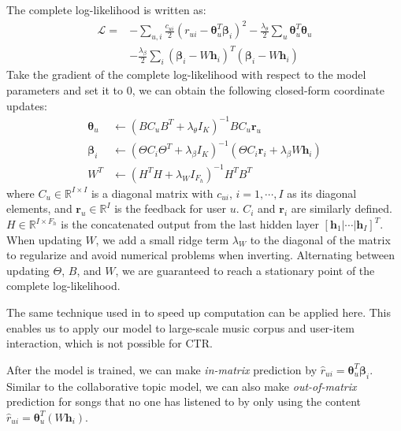 The complete log-likelihood is written as:
\begin{equation*}
\begin{split}
\mathcal{L} =& -\sum_{u, i} \frac{c_{ui}}{2} (r_{ui} - \boldsymbol\theta_u^T\boldsymbol\beta_i)^2 - \frac{\lambda_\theta}{2} \sum_u \boldsymbol\theta_u^T \boldsymbol\theta_u \\
&- \frac{\lambda_\beta}{2} \sum_i (\boldsymbol\beta_i - W\boldsymbol{h}_i)^T (\boldsymbol\beta_i - W\boldsymbol{h}_i)
\end{split}
\end{equation*}
Take the gradient of the complete log-likelihood with respect to the model parameters and set it to 0, we can obtain the following closed-form coordinate updates:
\begin{align}
\boldsymbol\theta_u &\leftarrow (BC_u B^T + \lambda_\theta I_K)^{-1} B C_u \boldsymbol{r}_u\\
\boldsymbol\beta_i &\leftarrow (\Theta C_i \Theta^T + \lambda_\beta I_K)^{-1} (\Theta C_i \boldsymbol{r}_i + \lambda_\beta W \boldsymbol{h}_i)\\
W^T &\leftarrow (H^T H + \lambda_W I_{F_h})^{-1} H^T B^T
\end{align}
where $C_u \in \mathbb{R}^{I \times I}$ is a diagonal matrix with $c_{ui}$, $i = 1, \cdots, I$ as its diagonal elements, and $\boldsymbol{r}_u \in \mathbb{R}^I$ is the feedback for user $u$. $C_i$ and $\boldsymbol{r}_i$ are similarly defined. $H \in \mathbb{R}^{I \times F_h}$ is the concatenated output from the last hidden layer $[\boldsymbol{h}_1 | \cdots | \boldsymbol{h}_I]^T$. When updating $W$, we add a small ridge term $\lambda_W$ to the diagonal of the matrix to regularize and avoid numerical problems when inverting. Alternating between updating $\Theta$, $B$, and $W$, we are guaranteed to reach a stationary point of the complete log-likelihood. 

The same technique used in \cite{hu2008collaborative} to speed up computation can be applied here. This enables us to apply our model to large-scale music corpus and user-item interaction, which is not possible for CTR.

After the model is trained, we can make \emph{in-matrix} prediction by $\hat{r}_{ui} = \boldsymbol\theta_u^T \boldsymbol\beta_i$. Similar to the collaborative topic model, we can also make \emph{out-of-matrix} prediction for songs that no one has listened to by only using the  content $\hat{r}_{ui} = \boldsymbol\theta_u^T (W\boldsymbol{h}_i)$.



